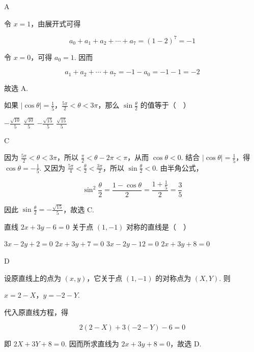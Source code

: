 \documentclass[UTF8,a4paper,oneside,11pt]{ctexbook}
\begin{document}
\begin{answer}
A
\end{answer}

\begin{solution}
令 \(x=1\)，由展开式可得

\[a_0+a_1+a_2+\cdots+a_7=(1-2)^7=-1\]

令 \(x=0\)，可得 \(a_0=1\). 因而

\[a_1+a_2+\cdots+a_7=-1-a_0=-1-1=-2\]

故选 A.
\end{solution}

\begin{problem}
如果 \(\left|\cos \theta\right| = \frac{1}{5}\)，\(\frac{5\pi}{2} < \theta < 3\pi\)，那么 \(\sin \frac{\theta}{2}\) 的值等于（\(\quad\)）

\choices
    {\(-\frac{\sqrt{10}}{5}\)}
    {\(\frac{\sqrt{10}}{5}\)}
    {\(-\frac{\sqrt{15}}{5}\)}
    {\(\frac{\sqrt{15}}{5}\)}
\end{problem}

\begin{answer}
C
\end{answer}

\begin{solution}
因为 \(\frac{5\pi}{2}<\theta<3\pi\)，所以 \(\frac\pi2<\theta-2\pi<\pi\)，从而 \(\cos\theta<0\). 结合 \(\left|\cos\theta\right|=\frac15\)，得 \(\cos\theta=-\frac15\). 又因为 \(\frac{5\pi}{4}<\frac\theta2<\frac{3\pi}{2}\)，所以 \(\sin\frac\theta2<0\). 由半角公式，

\[\sin^2\frac\theta2=\frac{1-\cos\theta}{2}=\frac{1+\frac15}{2}=\frac35\]

因此 \(\sin\frac\theta2=-\frac{\sqrt{15}}5\)，故选 C.
\end{solution}

\begin{problem}
直线 \(2x + 3y - 6 = 0\) 关于点 \((1,-1)\) 对称的直线是（\(\quad\)）

\choices
    {\(3x - 2y + 2 = 0\)}
    {\(2x + 3y + 7 = 0\)}
    {\(3x - 2y - 12 = 0\)}
    {\(2x + 3y + 8 = 0\)}
\end{problem}

\begin{answer}
D
\end{answer}

\begin{solution}
设原直线上的点为 \((x,y)\)，它关于点 \((1,-1)\) 的对称点为 \((X,Y)\). 则

\(x=2-X\)，\(y=-2-Y\).

代入原直线方程，得

\[2(2-X)+3(-2-Y)-6=0\]

即 \(2X+3Y+8=0\). 因而所求直线为 \(2x+3y+8=0\)，故选 D.
\end{solution}
\end{document}
